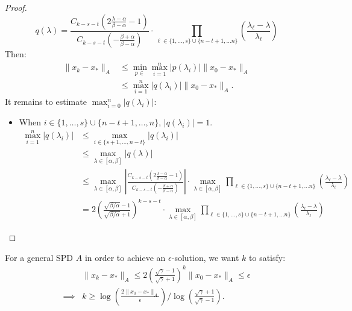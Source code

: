 \documentclass[../main/main.tex]{subfiles}
\begin{document}
\begin{proof}
\[                              q(\lambda)= \frac{C_{k-s-t}\left(2\frac{\lambda-\alpha}{\beta-\alpha} -1\right)}{C_{k-s-t}\left(-\frac{\beta+\alpha}{\beta-\alpha} \right)} \cdot \prod_{\ell \in \{1, \ldots , s\}\cup \{n-t+1, \ldots n\}}\left(\frac{\lambda_{\ell}-\lambda}{\lambda_{\ell}} \right)
                            \] Then:
                            \begin{align*}
                              \|x_{k}-x_{*}\|_{A} &\leq \min_{p \in } \max_{i = 1}^{n}| p(\lambda_{i})| \|x_{0}-x_{*}\|_{A} \\
                              &\leq \max_{i = 1}^{n}|q(\lambda_{i})| \|x_{0}-x_{*}\|_{A}
                              .\end{align*}
                            It remains to estimate $\max_{i = 0}^{n} |q(\lambda_{i})|$:
                            \begin{itemize}
                              \item When $i \in \{ 1, \ldots , s\}\cup \{n-t+1, \ldots , n\}$, $|q(\lambda_{i})|=1$.
                                    \begin{align*}
                                      \max_{i=1}^{n}|q(\lambda_{i})| &\leq \max_{i \in \{s+1, \ldots , n-t\}}| q(\lambda_{i})|\\
                                                                     & \leq \max_{\lambda \in[\alpha,\beta]} |q(\lambda)| \\
                                      &\leq \max_{\lambda \in [\alpha,\beta]} \left| \frac{C_{k-s-t}\left(2\frac{\lambda-\alpha}{\beta-\alpha} -1\right)}{C_{k-s-t}\left(-\frac{\beta+\alpha}{\beta-\alpha} \right)} \right| \cdot \max_{\lambda \in[\alpha,\beta]} \prod_{\ell \in \{1, \ldots , s\}\cup \{n-t+1, \ldots n\}}\left(\frac{\lambda_{\ell}-\lambda}{\lambda_{\ell}} \right) \\
                                      &= 2\left(\frac{\sqrt{\beta / \alpha}-1}{\sqrt{\beta / \alpha}+1} \right)^{ k-s-t }\cdot \max_{\lambda \in[\alpha,\beta]} \prod_{\ell \in \{1, \ldots , s\}\cup \{n-t+1, \ldots n\}}\left(\frac{\lambda_{\ell}-\lambda}{\lambda_{\ell}} \right)
                                    \end{align*}
                            \end{itemize}
\end{proof}
For a general SPD $A$ in order to achieve an $\epsilon $-solution, we want $k$ to satisfy:
\begin{align*}
  &\|x_{k}-x_{*}\|_{A} \leq  2 \left(\frac{\sqrt{\gamma }-1}{\sqrt{\gamma }+1} \right)^{k} \| x_{0}-x_{*}\|_{A} \leq  \epsilon  \\
  \implies  & k \geq  \log \left(\frac{2 \| x_{0}-x_{*}\|_{A}}{\epsilon } \right) / \log \left( \frac{\sqrt{\gamma }+1}{\sqrt{\gamma }-1} \right)
  .\end{align*}
\end{document}
